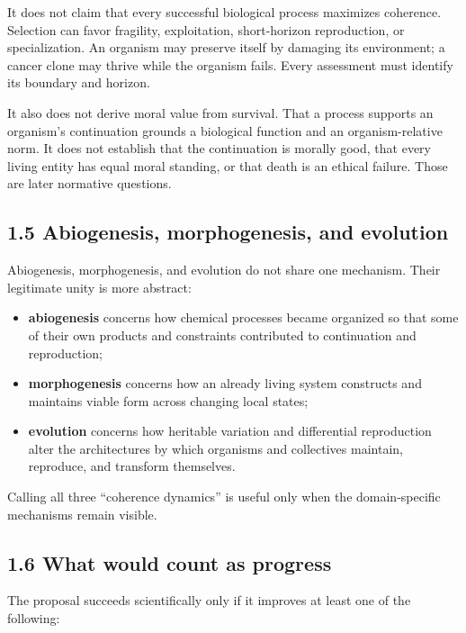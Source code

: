 \documentclass[
  11pt,
]{article}
\providecommand{\tightlist}{%
  \setlength{\itemsep}{0pt}\setlength{\parskip}{0pt}}
\begin{document}
It does not claim that every successful biological process maximizes
coherence. Selection can favor fragility, exploitation, short-horizon
reproduction, or specialization. An organism may preserve itself by
damaging its environment; a cancer clone may thrive while the organism
fails. Every assessment must identify its boundary and horizon.

It also does not derive moral value from survival. That a process
supports an organism's continuation grounds a biological function and an
organism-relative norm. It does not establish that the continuation is
morally good, that every living entity has equal moral standing, or that
death is an ethical failure. Those are later normative questions.

\subsection{1.5 Abiogenesis, morphogenesis, and
evolution}\label{abiogenesis-morphogenesis-and-evolution}

Abiogenesis, morphogenesis, and evolution do not share one mechanism.
Their legitimate unity is more abstract:

\begin{itemize}
\tightlist
\item
  \textbf{abiogenesis} concerns how chemical processes became organized
  so that some of their own products and constraints contributed to
  continuation and reproduction;
\item
  \textbf{morphogenesis} concerns how an already living system
  constructs and maintains viable form across changing local states;
\item
  \textbf{evolution} concerns how heritable variation and differential
  reproduction alter the architectures by which organisms and
  collectives maintain, reproduce, and transform themselves.
\end{itemize}

Calling all three ``coherence dynamics'' is useful only when the
domain-specific mechanisms remain visible.

\subsection{1.6 What would count as
progress}\label{what-would-count-as-progress}

The proposal succeeds scientifically only if it improves at least one of
the following:
\end{document}
